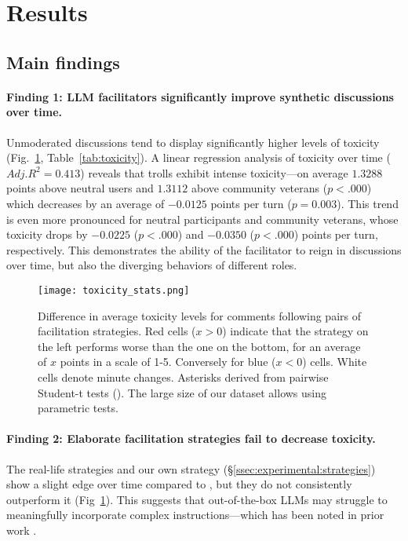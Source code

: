 %

\section{Results}
\label{sec:results}


\subsection{Main findings}
\label{ssec:results:main}

\paragraph{Finding 1: LLM facilitators significantly improve synthetic discussions over time.} Unmoderated discussions tend to display significantly higher levels of toxicity (Fig.~\ref{fig:toxicity_stats}, Table~\ref{tab:toxicity}). A linear regression analysis of toxicity over time ($Adj. R^2 = 0.413$) reveals that trolls exhibit intense toxicity---on average $1.3288$ points above neutral users and $1.3112$ above community veterans ($p < .000$) which decreases by an average of $\minus0.0125$ points per turn ($p = 0.003$). This trend is even more pronounced for neutral participants and community veterans, whose toxicity drops by $\minus0.0225$ ($p < .000$) and $\minus0.0350$ ($p < .000$) points per turn, respectively. This demonstrates the ability of the facilitator to reign in discussions over time, but also the diverging behaviors of different roles.

\begin{figure}
	\texttt{[image: toxicity\_stats.png]}
	\centering
	\caption{Difference in average toxicity levels for comments following pairs of facilitation strategies. Red cells ($x>0$) indicate that the strategy on the left performs worse than the one on the bottom, for an average of $x$ points in a scale of 1-5. Conversely for blue ($x<0$) cells. White cells denote minute changes. Asterisks derived from pairwise Student-t tests (\asterisknote). The large size of our dataset allows using parametric tests.}
	\label{fig:toxicity_stats}
\end{figure}

\paragraph{Finding 2: Elaborate facilitation strategies fail to decrease toxicity.}
The real-life strategies and our own strategy (\S\ref{ssec:experimental:strategies}) show a slight edge over time compared to \emph{\strategynoinstr}, but they do not consistently outperform it (Fig~\ref{fig:toxicity_stats}). This suggests that out-of-the-box LLMs may struggle to meaningfully incorporate complex instructions---which has been noted in prior work \cite{cho-etal-2024-language}.

